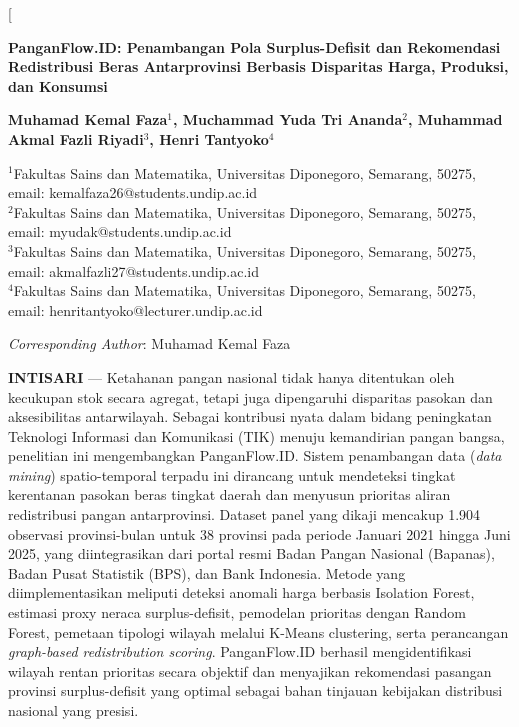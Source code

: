 \documentclass[journal, a4paper]{IEEEtran}
\begin{document}
\twocolumn[
  \begin{@twocolumnfalse}
    \begin{center}
      \vspace{1.5em}
      {\sffamily\bfseries\huge PanganFlow.ID: Penambangan Pola Surplus-Defisit dan Rekomendasi
      Redistribusi Beras Antarprovinsi Berbasis Disparitas Harga,
      Produksi, dan Konsumsi \par}
      \vspace{1.2em}
      
      {\sffamily\bfseries\large Muhamad Kemal Faza$^{1}$, Muchammad Yuda Tri Ananda$^{2}$, Muhammad Akmal Fazli Riyadi$^{3}$, Henri Tantyoko$^{4}$ \par}
      \vspace{0.8em}
      
      {\small $^{1}$Fakultas Sains dan Matematika, Universitas Diponegoro, Semarang, 50275, email: kemalfaza26@students.undip.ac.id \\
      $^{2}$Fakultas Sains dan Matematika, Universitas Diponegoro, Semarang, 50275, email: myudak@students.undip.ac.id \\
      $^{3}$Fakultas Sains dan Matematika, Universitas Diponegoro, Semarang, 50275, email: akmalfazli27@students.undip.ac.id \\
      $^{4}$Fakultas Sains dan Matematika, Universitas Diponegoro, Semarang, 50275, email: henritantyoko@lecturer.undip.ac.id \par}
      \vspace{0.5em}
      
      {\small\textit{Corresponding Author}: Muhamad Kemal Faza \par}
    \end{center}
    \vspace{1.5em}
    
    \noindent\textbf{\sffamily INTISARI} --- Ketahanan pangan nasional tidak hanya ditentukan oleh kecukupan stok secara agregat, tetapi juga dipengaruhi disparitas pasokan dan aksesibilitas antarwilayah. Sebagai kontribusi nyata dalam bidang peningkatan Teknologi Informasi dan Komunikasi (TIK) menuju kemandirian pangan bangsa, penelitian ini mengembangkan PanganFlow.ID. Sistem penambangan data (\textit{data mining}) spatio-temporal terpadu ini dirancang untuk mendeteksi tingkat kerentanan pasokan beras tingkat daerah dan menyusun prioritas aliran redistribusi pangan antarprovinsi. Dataset panel yang dikaji mencakup 1.904 observasi provinsi-bulan untuk 38 provinsi pada periode Januari 2021 hingga Juni 2025, yang diintegrasikan dari portal resmi Badan Pangan Nasional (Bapanas), Badan Pusat Statistik (BPS), dan Bank Indonesia. Metode yang diimplementasikan meliputi deteksi anomali harga berbasis Isolation Forest, estimasi proxy neraca surplus-defisit, pemodelan prioritas dengan Random Forest, pemetaan tipologi wilayah melalui K-Means clustering, serta perancangan \textit{graph-based redistribution scoring}. PanganFlow.ID berhasil mengidentifikasi wilayah rentan prioritas secara objektif dan menyajikan rekomendasi pasangan provinsi surplus-defisit yang optimal sebagai bahan tinjauan kebijakan distribusi nasional yang presisi.
    

\end{@twocolumnfalse}
\end{document}
